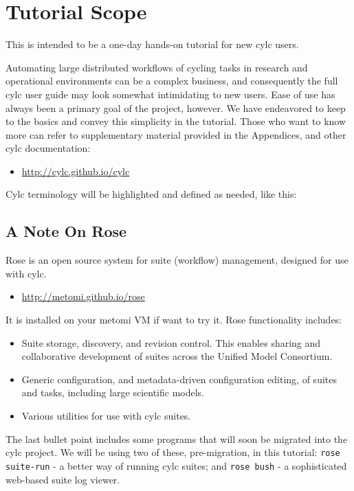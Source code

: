\section{Tutorial Scope}

This is intended to be a one-day hands-on tutorial for new cylc users.

Automating large distributed workflows of cycling tasks in research and
operational environments can be a complex business, and consequently the full
cylc user guide may look somewhat intimidating to new users.  Ease of use
has always been a primary goal of the project, however.  We have endeavored to
keep to the basics and convey this simplicity in the tutorial. Those who want
to know more can refer to supplementary material provided in the Appendices,
and other cylc documentation:

\begin{itemize}
    \item \url{http://cylc.github.io/cylc}
\end{itemize}

Cylc terminology will be highlighted and defined as needed, like this:


\subsection{A Note On Rose}

Rose is an open source system for suite (workflow) management, designed for use
with cylc.
\begin{itemize}
     \item \url{http://metomi.github.io/rose}
\end{itemize}
 
It is installed on your metomi VM if want to try it.  Rose functionality
includes:
\begin{itemize}
    \item Suite storage, discovery, and revision control.  This enables sharing
        and collaborative development of suites across the Unified Model
        Consortium.
    \item Generic configuration, and metadata-driven configuration editing, of
        suites and tasks, including large scientific models.
    \item Various utilities for use with cylc suites.
\end{itemize}

The last bullet point includes some programs that will soon be migrated into
the cylc project.  We will be using two of these, pre-migration, in this
tutorial: \lstinline{rose suite-run} - a better way of running cylc suites; and
\lstinline{rose bush} - a sophisticated web-based suite log viewer.
